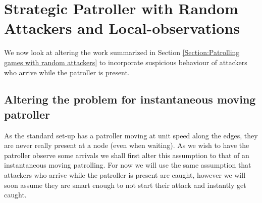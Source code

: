 \documentclass[a4paper,10pt]{article}
\theoremstyle{definition}
\theoremstyle{definition}
\theoremstyle{remark}
\theoremstyle{definition}
\begin{document}
\section{Strategic Patroller with Random Attackers and Local-observations}
\label{Section:Patrolling games with random attackers and local-observations}
We now look at altering the work summarized in Section \ref{Section:Patrolling games with random attackers} to incorporate suspicious behaviour of attackers who arrive while the patroller is present.

\subsection{Altering the problem for instantaneous moving patroller}
As the standard set-up has a patroller moving at unit speed along the edges, they are never really present at a node (even when waiting). As we wish to have the patroller observe some arrivals we shall first alter this assumption to that of an instantaneous moving patrolling. For now we will use the same assumption that attackers who arrive while the patroller is present are caught, however we will soon assume they are smart enough to not start their attack and instantly get caught.
\end{document}
